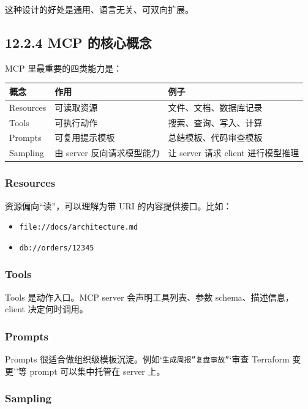这种设计的好处是通用、语言无关、可双向扩展。


\subsection{12.2.4 MCP 的核心概念}

MCP 里最重要的四类能力是：


\begingroup
\scriptsize
\setlength{\tabcolsep}{3pt}
\begin{longtable}{|p{}|p{}|p{}|}
\hline
概念 & 作用 & 例子 \\ \hline
Resources & 可读取资源 & 文件、文档、数据库记录 \\ \hline
Tools & 可执行动作 & 搜索、查询、写入、计算 \\ \hline
Prompts & 可复用提示模板 & 总结模板、代码审查模板 \\ \hline
Sampling & 由 server 反向请求模型能力 & 让 server 请求 client 进行模型推理 \\ \hline
\end{longtable}
\endgroup

\subsubsection{Resources}

资源偏向``读''，可以理解为带 URI 的内容提供接口。比如：


\begin{itemize}[leftmargin=2em]
\item \texttt{file://docs/architecture.md}
\item \texttt{db://orders/12345}
\end{itemize}

\subsubsection{Tools}

Tools 是动作入口。MCP server 会声明工具列表、参数 schema、描述信息，client 决定何时调用。


\subsubsection{Prompts}

Prompts 很适合做组织级模板沉淀。例如`\texttt{生成周报''}\texttt{复盘事故''}`审查 Terraform 变更''等 prompt 可以集中托管在 server 上。


\subsubsection{Sampling}


